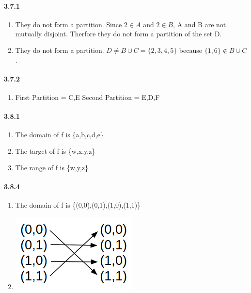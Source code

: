 \documentclass[11pt, letterpaper, twocolumn, fleqn]{article}
\begin{document}
    \paragraph{3.7.1}
    \renewcommand{\labelenumi}{\alph{enumi}.}
    \begin{enumerate}
        \item They do not form a partition. Since $2 \in A$ and $2 \in B$, A and B are not mutually disjoint. Therfore they do not form a partition of the set D.
        \item They do not form a partition. $D \neq B \cup C = \{2,3,4,5\}$ because $\{1, 6\} \notin B \cup C$. 
    \end{enumerate}
    
    \paragraph{3.7.2}
    \renewcommand{\labelenumi}{\alph{enumi}.}
    \begin{enumerate}
        \item 
            First Partition = C,E \newline
            Second Partition = E,D,F
    \end{enumerate}
    
    \paragraph{3.8.1}
    \renewcommand{\labelenumi}{\alph{enumi}.}
    \begin{enumerate}
        \item The domain of f is \{a,b,c,d,e\}
        \item The target of f is \{w,x,y,z\}
        \item The range of f is \{w,y,z\}
    \end{enumerate}
    
    \paragraph{3.8.4}
    \renewcommand{\labelenumi}{\alph{enumi}.}
    \begin{enumerate}
        \item The domain of f is \{(0,0),(0,1),(1,0),(1,1)\}
        \item \includegraphics[scale=.5]{3_8_4}
    \end{enumerate}
    
\end{document}
